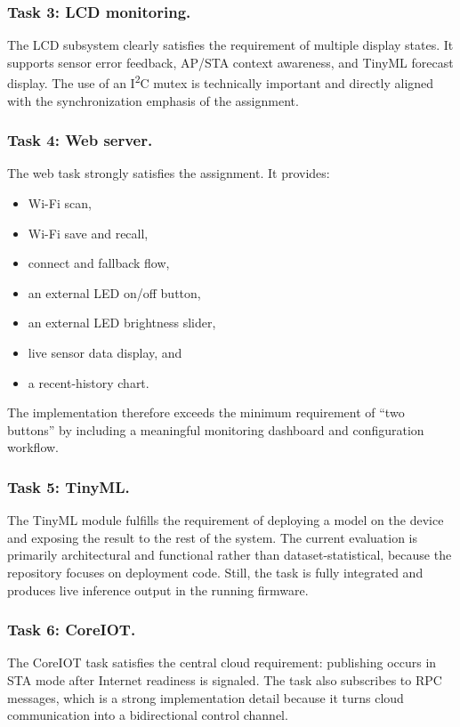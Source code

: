 \subsubsection*{Task 3: LCD monitoring.}
The LCD subsystem clearly satisfies the requirement of multiple display states.
It supports sensor error feedback, AP/STA context awareness, and TinyML
forecast display. The use of an I\textsuperscript{2}C mutex is technically
important and directly aligned with the synchronization emphasis of the
assignment.

\subsubsection*{Task 4: Web server.}
The web task strongly satisfies the assignment. It provides:
\begin{itemize}
  \item Wi-Fi scan,
  \item Wi-Fi save and recall,
  \item connect and fallback flow,
  \item an external LED on/off button,
  \item an external LED brightness slider,
  \item live sensor data display, and
  \item a recent-history chart.
\end{itemize}
The implementation therefore exceeds the minimum requirement of ``two buttons''
by including a meaningful monitoring dashboard and configuration workflow.

\subsubsection*{Task 5: TinyML.}
The TinyML module fulfills the requirement of deploying a model on the device
and exposing the result to the rest of the system. The current evaluation is
primarily architectural and functional rather than dataset-statistical, because
the repository focuses on deployment code. Still, the task is fully integrated
and produces live inference output in the running firmware.

\subsubsection*{Task 6: CoreIOT.}
The CoreIOT task satisfies the central cloud requirement: publishing occurs in
STA mode after Internet readiness is signaled. The task also subscribes to RPC
messages, which is a strong implementation detail because it turns cloud
communication into a bidirectional control channel.

